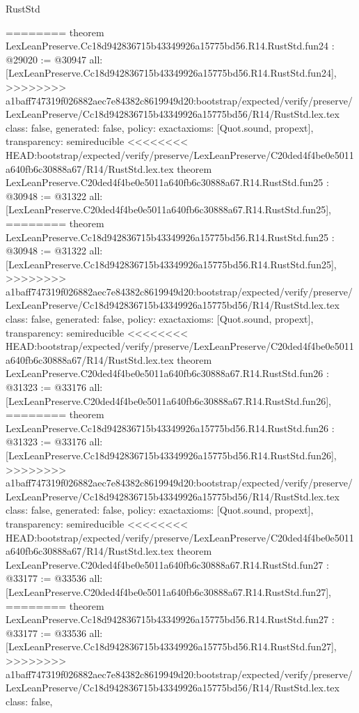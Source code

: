\begin{lexlean}{RustStd}
\begin{coremodule}
{\begin{coremodule}
{{{{{{{{{{{{{{{{{{{{{{{{{{{========
theorem LexLeanPreserve.Cc18d942836715b43349926a15775bd56.R14.RustStd.fun24 : @29020 := @30947 {
  all: [LexLeanPreserve.Cc18d942836715b43349926a15775bd56.R14.RustStd.fun24],
>>>>>>>> a1baff747319f026882aec7e84382c8619949d20:bootstrap/expected/verify/preserve/LexLeanPreserve/Cc18d942836715b43349926a15775bd56/R14/RustStd.lex.tex
  class: false,
  generated: false,
  policy: exact{axioms: [Quot.sound, propext]},
  transparency: semireducible
}
<<<<<<<< HEAD:bootstrap/expected/verify/preserve/LexLeanPreserve/C20ded4f4be0e5011a640fb6c30888a67/R14/RustStd.lex.tex
theorem LexLeanPreserve.C20ded4f4be0e5011a640fb6c30888a67.R14.RustStd.fun25 : @30948 := @31322 {
  all: [LexLeanPreserve.C20ded4f4be0e5011a640fb6c30888a67.R14.RustStd.fun25],
========
theorem LexLeanPreserve.Cc18d942836715b43349926a15775bd56.R14.RustStd.fun25 : @30948 := @31322 {
  all: [LexLeanPreserve.Cc18d942836715b43349926a15775bd56.R14.RustStd.fun25],
>>>>>>>> a1baff747319f026882aec7e84382c8619949d20:bootstrap/expected/verify/preserve/LexLeanPreserve/Cc18d942836715b43349926a15775bd56/R14/RustStd.lex.tex
  class: false,
  generated: false,
  policy: exact{axioms: [Quot.sound, propext]},
  transparency: semireducible
}
<<<<<<<< HEAD:bootstrap/expected/verify/preserve/LexLeanPreserve/C20ded4f4be0e5011a640fb6c30888a67/R14/RustStd.lex.tex
theorem LexLeanPreserve.C20ded4f4be0e5011a640fb6c30888a67.R14.RustStd.fun26 : @31323 := @33176 {
  all: [LexLeanPreserve.C20ded4f4be0e5011a640fb6c30888a67.R14.RustStd.fun26],
========
theorem LexLeanPreserve.Cc18d942836715b43349926a15775bd56.R14.RustStd.fun26 : @31323 := @33176 {
  all: [LexLeanPreserve.Cc18d942836715b43349926a15775bd56.R14.RustStd.fun26],
>>>>>>>> a1baff747319f026882aec7e84382c8619949d20:bootstrap/expected/verify/preserve/LexLeanPreserve/Cc18d942836715b43349926a15775bd56/R14/RustStd.lex.tex
  class: false,
  generated: false,
  policy: exact{axioms: [Quot.sound, propext]},
  transparency: semireducible
}
<<<<<<<< HEAD:bootstrap/expected/verify/preserve/LexLeanPreserve/C20ded4f4be0e5011a640fb6c30888a67/R14/RustStd.lex.tex
theorem LexLeanPreserve.C20ded4f4be0e5011a640fb6c30888a67.R14.RustStd.fun27 : @33177 := @33536 {
  all: [LexLeanPreserve.C20ded4f4be0e5011a640fb6c30888a67.R14.RustStd.fun27],
========
theorem LexLeanPreserve.Cc18d942836715b43349926a15775bd56.R14.RustStd.fun27 : @33177 := @33536 {
  all: [LexLeanPreserve.Cc18d942836715b43349926a15775bd56.R14.RustStd.fun27],
>>>>>>>> a1baff747319f026882aec7e84382c8619949d20:bootstrap/expected/verify/preserve/LexLeanPreserve/Cc18d942836715b43349926a15775bd56/R14/RustStd.lex.tex
  class: false,
}}}}}}}}}}}}}}}}}}}}}}}}}}}}}}}
\end{coremodule}}
\end{coremodule}
\end{lexlean}
